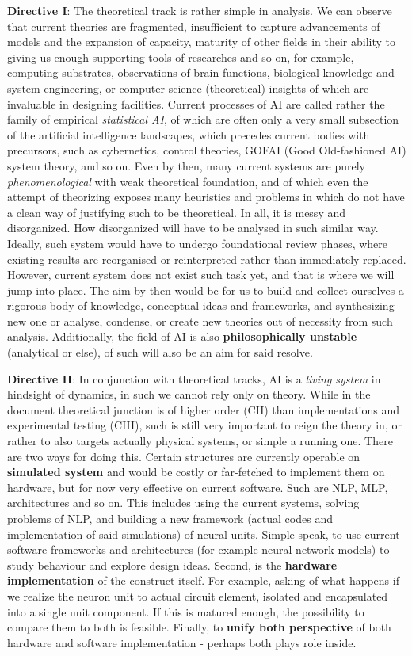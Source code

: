 \documentclass[9pt,a4paper]{article}
\begin{document}
\textbf{Directive I}: The theoretical track is rather simple in analysis. We can observe that current theories are fragmented, insufficient to capture advancements of models and the expansion of capacity, maturity of other fields in their ability to giving us enough supporting tools of researches and so on, for example, computing substrates, observations of brain functions, biological knowledge and system engineering, or computer-science (theoretical) insights of which are invaluable in designing facilities. Current processes of AI are called rather the family of empirical \textit{statistical AI}, of which are often only a very small subsection of the artificial intelligence landscapes, which precedes current bodies with precursors, such as cybernetics, control theories, GOFAI (Good Old-fashioned AI) system theory, and so on. Even by then, many current systems are purely \textit{phenomenological} with weak theoretical foundation, and of which even the attempt of theorizing exposes many heuristics and problems in which do not have a clean way of justifying such to be theoretical. In all, it is messy and disorganized. How disorganized will have to be analysed in such similar way. Ideally, such system would have to undergo foundational review phases, where existing results are reorganised or reinterpreted rather than immediately replaced. However, current system does not exist such task yet, and that is where we will jump into place. The aim by then would be for us to build and collect ourselves a rigorous body of knowledge, conceptual ideas and frameworks, and synthesizing new one or analyse, condense, or create new theories out of necessity from such analysis. Additionally, the field of AI is also \textbf{philosophically unstable} (analytical or else), of such will also be an aim for said resolve. 

\textbf{Directive II}: In conjunction with theoretical tracks, AI is a \textit{living system} in hindsight of dynamics, in such we cannot rely only on theory. While in the document theoretical junction is of higher order (CII) than implementations and experimental testing (CIII), such is still very important to reign the theory in, or rather to also targets actually physical systems, or simple a running one. There are two ways for doing this. Certain structures are currently operable on \textbf{simulated system} and would be costly or far-fetched to implement them on hardware, but for now very effective on current software. Such are NLP, MLP, architectures and so on. This includes using the current systems, solving problems of NLP, and building a new framework (actual codes and implementation of said simulations) of neural units. Simple speak, to use current software frameworks and architectures (for example neural network models) to study behaviour and explore design ideas. Second, is the \textbf{hardware implementation} of the construct itself. For example, asking of what happens if we realize the neuron unit to actual circuit element, isolated and encapsulated into a single unit component. If this is matured enough, the possibility to compare them to both is feasible. Finally, to \textbf{unify both perspective} of both hardware and software implementation - perhaps both plays role inside. 
\end{document}
